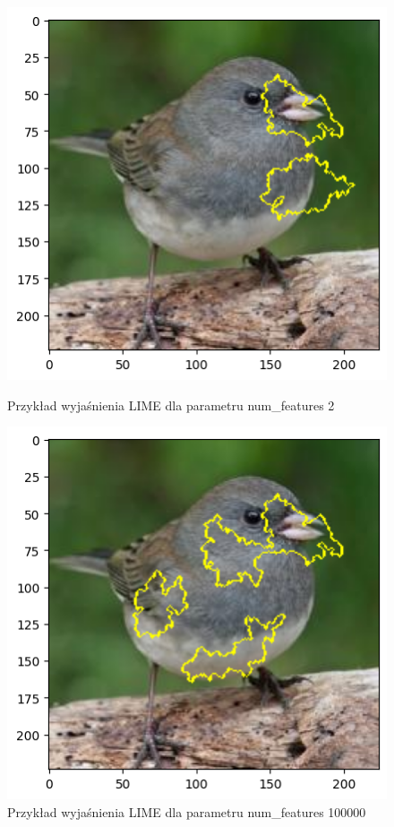 \begin{figure}
	\centering
	\begin{minipage}[b]{0.3\textwidth}
		\includegraphics[width=.9\textwidth]{img/parameters/lime/num_features_2}
		\caption{Przykład wyjaśnienia LIME dla parametru num\_features 2}  \label{rys:parameters_lime_numsamples_5}
	\end{minipage}
	\begin{minipage}[b]{0.3\textwidth}
		\centering\includegraphics[width=.9\textwidth]{img/parameters/lime/num_features_100000}
		\caption{Przykład wyjaśnienia LIME dla parametru num\_features 100000}  \label{rys:parameters_lime_numsamples_1000}
	\end{minipage}
\end{figure}

